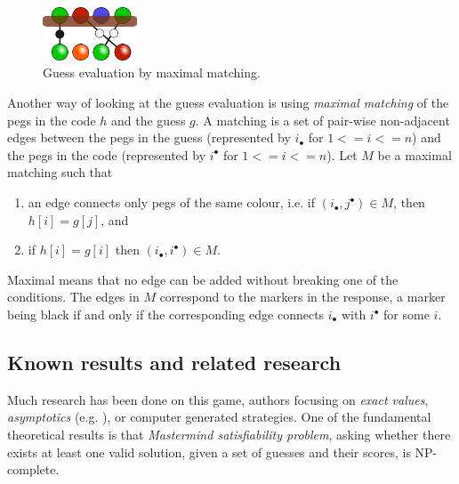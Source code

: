 \begin{figure}
  \vspace{-5mm}
  \begin{center}
  \includegraphics[width=0.25\textwidth]{pictures/mastermind-matching.png}
  \end{center}
  \caption{Guess evaluation by maximal matching.}
  \vspace{-5mm}
\end{figure}

\newcommand{\incode}[1]{#1^\bullet}
\newcommand{\inguess}[1]{#1_\bullet}

Another way of looking at the guess evaluation is using
  \emph{maximal matching} of the pegs in the code $h$ and the guess $g$.
A matching is a set of pair-wise non-adjacent edges between
  the pegs in the guess (represented by $\inguess{i}$ for $1<=i<=n$) and
  the pegs in the code (represented by $\incode{i}$ for $1<=i<=n$).
Let $M$ be a maximal matching such that

\begin{enumerate}
\item an edge connects only pegs of the same colour, i.e. if $(\inguess{i},\incode{j})\in M$, then $h[i] = g[j]$, and
\item if $h[i] = g[i]$ then $(\inguess{i},\incode{i})\in M$.
\end{enumerate}

Maximal means that no edge can be added without breaking one of the conditions.
The edges in $M$ correspond to the markers in the response,
  a marker being black if and only if the corresponding edge connects $\inguess{i}$
  with $\incode{i}$ for some $i$.

\subsection{Known results and related research}

Much research has been done on this game, authors focusing
  on \emph{exact values}, \emph{asymptotics} (e.g. \cite{mm-chvatal}), or
  computer generated strategies.
One of the fundamental theoretical results is that
  \emph{Mastermind satisfiability problem}, asking
  whether there exists at least one valid solution,
  given a set of guesses and their scores, is NP-complete\cite{mm-np}.

